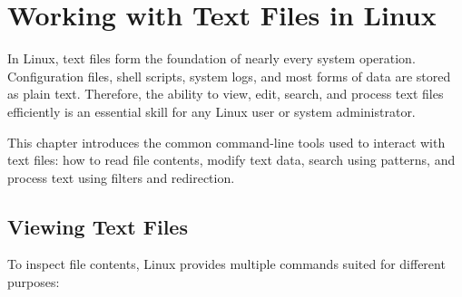 
\chapter{Working with Text Files in Linux}
\label{ch:textfiles}

In Linux, text files form the foundation of nearly every system operation. Configuration files, shell scripts, system logs, and most forms of data are stored as plain text. Therefore, the ability to view, edit, search, and process text files efficiently is an essential skill for any Linux user or system administrator.

This chapter introduces the common command-line tools used to interact with text files: how to read file contents, modify text data, search using patterns, and process text using filters and redirection.

\section{Viewing Text Files}
To inspect file contents, Linux provides multiple commands suited for different purposes:


